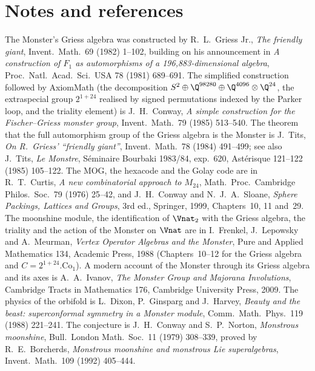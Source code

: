 \section{Notes and references}\label{ch21:sec:notes}

The Monster's Griess algebra was constructed by R.~L.~Griess Jr., \emph{The friendly giant}, Invent.\ Math.\
69 (1982) 1--102, building on his announcement in \emph{A construction of $F_1$ as automorphisms of a
196,883-dimensional algebra}, Proc.\ Natl.\ Acad.\ Sci.\ USA 78 (1981) 689--691.  The simplified construction
followed by AxiomMath (the decomposition $S^2\oplus\Q^{98280}\oplus\Q^{4096}\otimes\Q^{24}$, the extraspecial
group $2^{1+24}$ realised by signed permutations indexed by the Parker loop, and the triality element) is
J.~H.~Conway, \emph{A simple construction for the Fischer--Griess monster group}, Invent.\ Math.\ 79 (1985)
513--540.  The theorem that the full automorphism group of the Griess algebra is the Monster is J.~Tits,
\emph{On R.~Griess' ``friendly giant''}, Invent.\ Math.\ 78 (1984) 491--499; see also J.~Tits, \emph{Le Monstre},
S\'eminaire Bourbaki 1983/84, exp.\ 620, Ast\'erisque 121--122 (1985) 105--122.  The MOG, the hexacode and the
Golay code are in R.~T.~Curtis, \emph{A new combinatorial approach to $M_{24}$}, Math.\ Proc.\ Cambridge
Philos.\ Soc.\ 79 (1976) 25--42, and J.~H.~Conway and N.~J.~A.~Sloane, \emph{Sphere Packings, Lattices and
Groups}, 3rd ed., Springer, 1999, Chapters~10, 11 and~29.  The moonshine module, the identification of
$\Vnat_2$ with the Griess algebra, the triality and the action of the Monster on $\Vnat$ are in I.~Frenkel,
J.~Lepowsky and A.~Meurman, \emph{Vertex Operator Algebras and the Monster}, Pure and Applied Mathematics 134,
Academic Press, 1988 (Chapters~10--12 for the Griess algebra and $C=2^{1+24}.\mathrm{Co}_1$).  A modern
account of the Monster through its Griess algebra and its axes is A.~A.~Ivanov, \emph{The Monster Group and
Majorana Involutions}, Cambridge Tracts in Mathematics 176, Cambridge University Press, 2009.  The physics
of the orbifold is L.~Dixon, P.~Ginsparg and J.~Harvey, \emph{Beauty and the beast: superconformal symmetry in
a Monster module}, Comm.\ Math.\ Phys.\ 119 (1988) 221--241.  The conjecture is J.~H.~Conway and S.~P.~Norton,
\emph{Monstrous moonshine}, Bull.\ London Math.\ Soc.\ 11 (1979) 308--339, proved by R.~E.~Borcherds,
\emph{Monstrous moonshine and monstrous Lie superalgebras}, Invent.\ Math.\ 109 (1992) 405--444.

